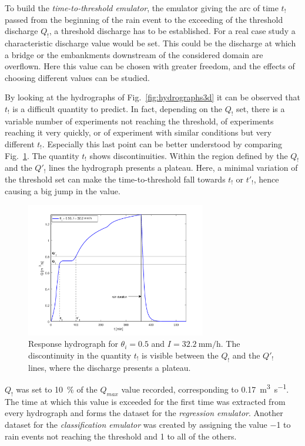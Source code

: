 To build the \emph{time-to-threshold emulator}, the emulator giving the arc of time $t_!$ passed from the beginning of the rain event to the exceeding of the threshold discharge $Q_!$, a threshold discharge has to be established.
For a real case study a characteristic discharge value would be set.
This could be the discharge at which a bridge or the embankments downstream of the considered domain are overflown.
Here this value can be chosen with greater freedom, and the effects of choosing different values can be studied.

By looking at the hydrographs of Fig.~\ref{fig:hydrographs3d} it can be observed that $t_!$ is a difficult quantity to predict.
In fact, depending on the $Q_!$ set, there is a variable number of experiments not reaching the threshold, of experiments reaching it very quickly, or of experiment with similar conditions but very different $t_!$.
Especially this last point can be better understood by comparing Fig.~\ref{fig:hydrograph}.
The quantity $t_!$ shows discontinuities.
Within the region defined by the $Q_!$ and the $Q'_!$ lines the hydrograph presents a plateau.
Here, a minimal variation of the threshold set can make the time-to-threshold fall towards $t_!$ or $t'_!$, hence causing a big jump in the value.

\begin{figure}[h]
  \centering
  \includegraphics[width=0.7\textwidth]{Figures/hydrograph.png}
  \caption{Response hydrograph for $\theta_i = \num{0.5}$ and $I = \SI{32.2}{\milli\meter\per\hour}$. The discontinuity in the quantity $t_!$ is visible between the $Q_!$ and the $Q'_!$ lines, where the discharge presents a plateau.}
  \label{fig:hydrograph}
\end{figure}

$Q_!$ was set to \SI{10}{\percent}  of the $Q_{max}$ value recorded, corresponding to \SI{0.17}{\cubic\meter\per\second}.
The time at which this value is exceeded for the first time was extracted from every hydrograph and forms the dataset for the \emph{regression emulator}.
Another dataset for the \emph{classification emulator} was created by assigning the value \num{-1} to rain events not reaching the threshold and \num{1} to all of the others.


